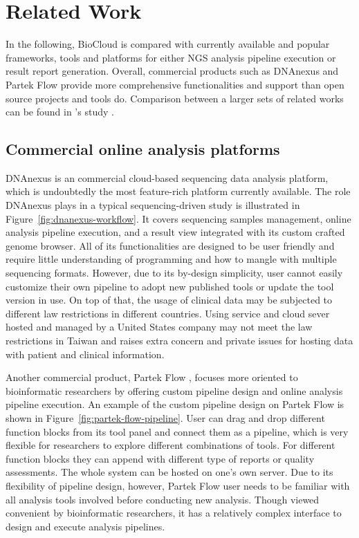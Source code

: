 \chapter{Related Work}
\label{c:related-work}

In the following, BioCloud is compared with currently available and popular
frameworks, tools and platforms for either NGS analysis pipeline execution or
result report generation. Overall, commercial products such as DNAnexus and
Partek Flow provide more comprehensive functionalities and support than open
source projects and tools do. Comparison between a larger sets of related works
can be found in \citeauthor{leipzig2016:review}'s study
\cite{leipzig2016:review}.


\section{Commercial online analysis platforms}

DNAnexus \cite{:dnanexus} is an commercial cloud-based sequencing data analysis
platform, which is undoubtedly the most feature-rich platform currently
available. The role DNAnexus plays in a typical sequencing-driven study is
illustrated in Figure~\ref{fig:dnanexus-workflow}. It covers sequencing samples
management, online analysis pipeline execution, and a result view integrated
with its custom crafted genome browser. All of its functionalities are designed
to be user friendly and require little understanding of programming and how to
mangle with multiple sequencing formats. However, due to its by-design
simplicity, user cannot easily customize their own pipeline to adopt new
published tools or update the tool version in use. On top of that, the usage of
clinical data may be subjected to different law restrictions in different
countries. Using service and cloud sever hosted and managed by a United States
company may not meet the law restrictions in Taiwan and raises extra concern
and private issues for hosting data with patient and clinical information.



Another commercial product, Partek Flow \cite{:partek}, focuses more oriented
to bioinformatic researchers by offering custom pipeline design and online
analysis pipeline execution. An example of the custom pipeline design on Partek
Flow is shown in Figure~\ref{fig:partek-flow-pipeline}. User can drag and drop
different function blocks from its tool panel and connect them as a pipeline,
which is very flexible for researchers to explore different combinations of
tools. For different function blocks they can append with different type of
reports or quality assessments. The whole system can be hosted on one's own
server. Due to its flexibility of pipeline design, however, Partek Flow user
needs to be familiar with all analysis tools involved before conducting new
analysis. Though viewed convenient by bioinformatic researchers, it has a
relatively complex interface to design and execute analysis pipelines.

